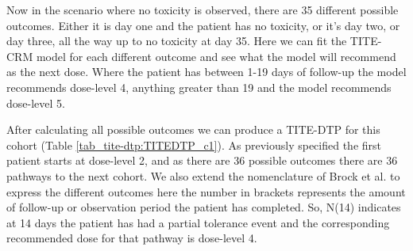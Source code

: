 Now in the scenario where no toxicity is observed, there are 35 different possible outcomes. Either it is day one and the patient has no toxicity, or it's day two, or day three, all the way up to no toxicity at day 35. Here we can fit the TITE-CRM model for each different outcome and see what the model will recommend as the next dose. Where the patient has between 1-19 days of follow-up the model recommends dose-level 4, anything greater than 19 and the model recommends dose-level 5.  

After calculating all possible outcomes we can produce a TITE-DTP for this cohort (Table \ref{tab_tite-dtp:TITEDTP_c1}). As previously specified the first patient starts at dose-level 2, and as there are 36 possible outcomes there are 36 pathways to the next cohort. We also extend the nomenclature of Brock et al. \cite{brockImplementingEffToxDosefinding2017} to express the different outcomes here the number in brackets represents the amount of follow-up or observation period the patient has completed. So,  N(14) indicates at 14 days the patient has had a partial tolerance event and the corresponding recommended dose for that pathway is dose-level 4.

